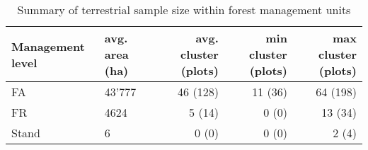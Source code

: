 \begin{table}[ht]
\centering
\caption{Summary of terrestrial sample size within forest management units}
\label{tab:adj_r2_within}
\begin{tabular}{llrrr}
  \hline
Management level & avg. area (ha) & avg. cluster (plots) & min cluster (plots) & max cluster (plots)\\ 
  \hline
 FA   & 43'777 & 46 (128) & 11 (36) &  64 (198) \\ 
 FR   & 4624 & 5 (14) & 0 (0)  & 13 (34) \\ 
 Stand & 6 & 0 (0) & 0 (0) & 2 (4) \\ 
   \hline
\hline
\end{tabular}
\end{table}

